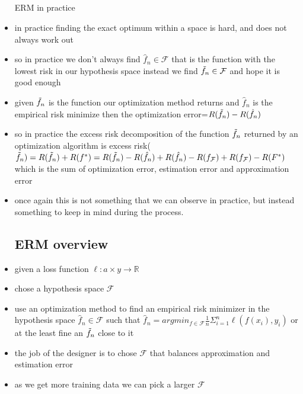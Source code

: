 \documentclass{article}
\begin{document}
\begin{itemize}
\subsection{}{ERM in practice}
\item in practice finding the exact optimum within a space is hard, and does not always work out 
\item so in practice we don't always find $\hat{f}_{n}\in \mathcal{F}$ that is the function with the lowest risk in our hypothesis space instead we find $\Tilde{f}_{n}\in \mathcal{F}$ and hope it is good enough 
\item given $\Tilde{f}_{n}$ is the function our optimization method returns and $\hat{f}_{n}$ is the empirical risk minimize then the optimization error=$R(\Tilde{f}_{n})-R(\hat{f}_{n})$
\item so in practice the excess risk decomposition of the function $\Tilde{f}_{n}$ returned by an optimization algorithm is excess risk($\Tilde{f}_{n})=R(\Tilde{f}_{n})+R(f^{*})=R(\Tilde{f}_{n})-R(\hat{f}_{n})+R(\hat{f}_{n})-R(f_{\mathcal{F}})+R(f_{\mathcal{F}})-R(F^{*})$ which is the sum of optimization error, estimation error and approximation error
\item once again this is not something that we can observe in practice, but instead something to keep in mind during the process. 
\subsection{ERM overview}
\item given a loss function $\ell:a\times y\rightarrow \mathbb{R}$
\item chose a hypothesis space $\mathcal{F}$
\item use an optimization method to find an empirical risk minimizer in the hypothesis space $\hat{f}_{n}\in \mathcal{F}$ such that $\hat{f}_{n}=argmin_{f\in \mathcal{F}}\frac{1}{n}\Sigma_{i=1}^{n}\ell(f(x_i),y_i)$ or at the least fine an $\Tilde{f}_{n}$ close to it 
\item the job of the designer is to chose $\mathcal{F}$ that balances approximation and estimation error 
\item as we get more training data we can pick a larger $\mathcal{F}$
\end{itemize}
\end{document}
